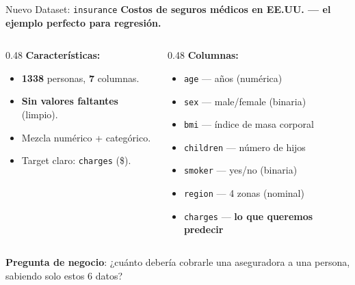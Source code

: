 \documentclass[aspectratio=169, 11pt]{beamer}
\begin{document}
\begin{frame}[shrink=5]{Nuevo Dataset: \texttt{insurance}}
  \vspace{-4pt}
  {\footnotesize\color{arcaDark}\bfseries
    Costos de seguros médicos en EE.UU. --- el ejemplo perfecto para regresión.}

  \vspace{6pt}
  \begin{columns}[T]
    \begin{column}{0.48\textwidth}
      {\footnotesize\bfseries\color{arcaDark} Características:}
      \vspace{4pt}

      {\scriptsize
      \begin{itemize}\setlength{\itemsep}{4pt}
        \item[{\color{codeGreen}\faCheckCircle}]
          \textbf{1338} personas, \textbf{7} columnas.
        \item[{\color{codeGreen}\faCheckCircle}]
          \textbf{Sin valores faltantes} (limpio).
        \item[{\color{codeGreen}\faCheckCircle}]
          Mezcla numérico + categórico.
        \item[{\color{codeGreen}\faCheckCircle}]
          Target claro: \texttt{charges} (\$).
      \end{itemize}
      }
    \end{column}

    \begin{column}{0.48\textwidth}
      {\footnotesize\bfseries\color{arcaDark} Columnas:}
      \vspace{4pt}

      {\scriptsize
      \begin{itemize}\setlength{\itemsep}{3pt}
        \item \texttt{age} --- años (numérica)
        \item \texttt{sex} --- male/female (binaria)
        \item \texttt{bmi} --- índice de masa corporal
        \item \texttt{children} --- número de hijos
        \item \texttt{smoker} --- yes/no (binaria)
        \item \texttt{region} --- 4 zonas (nominal)
        \item \texttt{charges} --- \textbf{lo que queremos predecir}
      \end{itemize}
      }
    \end{column}
  \end{columns}

  \vspace{6pt}
  {\footnotesize\color{arcaDark}
    \faLightbulb\hspace{4pt}
    \textbf{Pregunta de negocio}: ¿cuánto debería cobrarle una aseguradora
    a una persona, sabiendo solo estos 6 datos?}
\end{frame}
\end{document}
